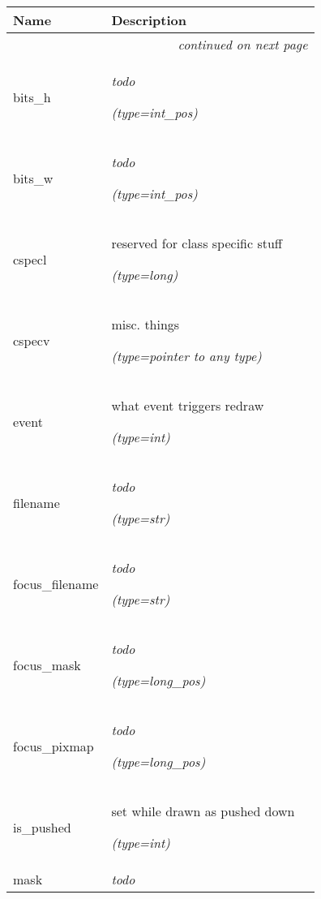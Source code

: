     \vspace{-1cm}
\hspace{\varindent}\begin{longtable}{|p{\varnamewidth}|p{\vardescrwidth}|l}
\cline{1-2}
\cline{1-2} \centering \textbf{Name} & \centering \textbf{Description}& \\
\cline{1-2}
\endhead\cline{1-2}\multicolumn{3}{r}{\small\textit{continued on next page}}\\\endfoot\cline{1-2}
\endlastfoot\raggedright b\-i\-t\-s\-\_\-h\- & \raggedright \emph{todo}

            {\it (type=int\_pos)}&\\
\cline{1-2}
\raggedright b\-i\-t\-s\-\_\-w\- & \raggedright \emph{todo}

            {\it (type=int\_pos)}&\\
\cline{1-2}
\raggedright c\-s\-p\-e\-c\-l\- & \raggedright reserved for class specific stuff

            {\it (type=long)}&\\
\cline{1-2}
\raggedright c\-s\-p\-e\-c\-v\- & \raggedright misc. things

            {\it (type=pointer to any type)}&\\
\cline{1-2}
\raggedright e\-v\-e\-n\-t\- & \raggedright what event triggers redraw

            {\it (type=int)}&\\
\cline{1-2}
\raggedright f\-i\-l\-e\-n\-a\-m\-e\- & \raggedright \emph{todo}

            {\it (type=str)}&\\
\cline{1-2}
\raggedright f\-o\-c\-u\-s\-\_\-f\-i\-l\-e\-n\-a\-m\-e\- & \raggedright \emph{todo}

            {\it (type=str)}&\\
\cline{1-2}
\raggedright f\-o\-c\-u\-s\-\_\-m\-a\-s\-k\- & \raggedright \emph{todo}

            {\it (type=long\_pos)}&\\
\cline{1-2}
\raggedright f\-o\-c\-u\-s\-\_\-p\-i\-x\-m\-a\-p\- & \raggedright \emph{todo}

            {\it (type=long\_pos)}&\\
\cline{1-2}
\raggedright i\-s\-\_\-p\-u\-s\-h\-e\-d\- & \raggedright set while drawn as pushed down

            {\it (type=int)}&\\
\cline{1-2}
\raggedright m\-a\-s\-k\- & \raggedright \emph{todo}


\end{longtable}
